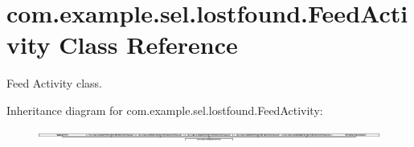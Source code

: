 \hypertarget{classcom_1_1example_1_1sel_1_1lostfound_1_1FeedActivity}{\section{com.\-example.\-sel.\-lostfound.\-Feed\-Activity Class Reference}
\label{classcom_1_1example_1_1sel_1_1lostfound_1_1FeedActivity}
}


Feed Activity class.  


Inheritance diagram for com.\-example.\-sel.\-lostfound.\-Feed\-Activity\-:\begin{figure}[H]
\begin{center}
\leavevmode
\includegraphics[height=0.347826cm]{classcom_1_1example_1_1sel_1_1lostfound_1_1FeedActivity}
\end{center}
\end{figure}
